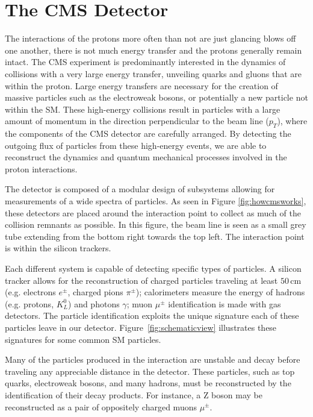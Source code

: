 \chapter{The CMS Detector}
\label{chap:detector}

The interactions of the protons more often than not are just glancing blows off one another, there is not much energy transfer and the protons generally remain intact. The CMS experiment is predominantly interested in the dynamics of collisions with a very large energy transfer, unveiling quarks and gluons that are within the proton. Large energy transfers are necessary for the creation of massive particles such as the electroweak bosons, or potentially a new particle not within the SM. These high-energy collisions result in particles with a large amount of momentum in the direction perpendicular to the beam line ($p_{T}$), where the components of the CMS detector are carefully arranged. By detecting the outgoing flux of particles from these high-energy events, we are able to reconstruct the dynamics and quantum mechanical processes involved in the proton interactions.

The detector is composed of a modular design of subsystems allowing for measurements of a wide spectra of particles. As seen in Figure \ref{fig:howcmsworks}, these detectors are placed around the interaction point to collect as much of the collision remnants as possible. In this figure, the beam line is seen as a small grey tube extending from the bottom right towards the top left. The interaction point is within the silicon trackers.

Each different system is capable of detecting specific types of particles. A silicon tracker allows for the reconstruction of charged particles traveling at least $50\,\mathrm{cm}$ (e.g. electrons $e^{\pm}$, charged pions $\pi^{\pm}$); calorimeters measure the energy of hadrons (e.g. protons, $K^{0}_{L}$) and photons $\gamma$; muon $\mu^{\pm}$ identification is made with gas detectors. The particle identification exploits the unique signature each of these particles leave in our detector. Figure~\ref{fig:schematicview} illustrates these signatures for some common SM particles. 

Many of the particles produced in the interaction are unstable and decay before traveling any appreciable distance in the detector. These particles, such as top quarks, electroweak bosons, and many hadrons, must be reconstructed by the identification of their decay products. For instance, a Z boson may be reconstructed as a pair of oppositely charged muons $\mu^{\pm}$.

